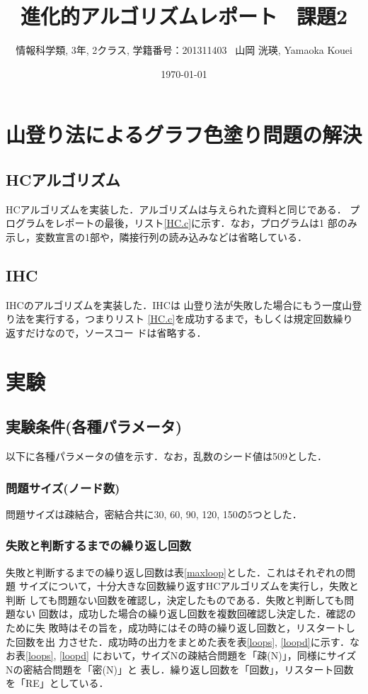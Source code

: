 \documentclass[a4j]{jarticle}
\title{進化的アルゴリズムレポート \ 課題2}
\author{情報科学類, 3年, 2クラス, 学籍番号：201311403 \ 山岡 洸瑛, Yamaoka
Kouei}
\date{\today}
\begin{document}
\maketitle

\section*{山登り法によるグラフ色塗り問題の解決}
\subsection*{HCアルゴリズム}
HCアルゴリズムを実装した．アルゴリズムは与えられた資料と同じである．
プログラムをレポートの最後，リスト\ref{HC.c}に示す．なお，プログラムは1
部のみ示し，変数宣言の1部や，隣接行列の読み込みなどは省略している．

\subsection*{IHC}
IHCのアルゴリズムを実装した．IHCは
山登り法が失敗した場合にもう一度山登り法を実行する，つまりリスト
\ref{HC.c}を成功するまで，もしくは規定回数繰り返すだけなので，ソースコー
ドは省略する．

\section*{実験}
\subsection*{実験条件(各種パラメータ)}
以下に各種パラメータの値を示す．なお，乱数のシード値は509とした．

\subsubsection*{問題サイズ(ノード数)}
問題サイズは疎結合，密結合共に30, 60, 90, 120, 150の5つとした．

\subsubsection*{失敗と判断するまでの繰り返し回数}
失敗と判断するまでの繰り返し回数は表\ref{maxloop}とした．これはそれぞれの問題
サイズについて，十分大きな回数繰り返すHCアルゴリズムを実行し，失敗と判断
しても問題ない回数を確認し，決定したものである．失敗と判断しても問題ない
回数は，成功した場合の繰り返し回数を複数回確認し決定した．確認のために失
敗時はその旨を，成功時にはその時の繰り返し回数と，リスタートした回数を出
力させた．成功時の出力をまとめた表を表\ref{loops}, \ref{loopd}に示す．な
お表\ref{loops}, \ref{loopd}
において，サイズNの疎結合問題を「疎(N)」，同様にサイズNの密結合問題を「密(N)」と
表し．繰り返し回数を「回数」，リスタート回数を「RE」としている．
\end{document}
